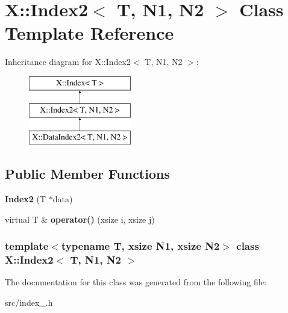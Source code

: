 \hypertarget{class_x_1_1_index2}{\section{X\-:\-:Index2$<$ T, N1, N2 $>$ Class Template Reference}
\label{class_x_1_1_index2}
}
Inheritance diagram for X\-:\-:Index2$<$ T, N1, N2 $>$\-:\begin{figure}[H]
\begin{center}
\leavevmode
\includegraphics[height=3.000000cm]{class_x_1_1_index2}
\end{center}
\end{figure}
\subsection*{Public Member Functions}
\begin{DoxyCompactItemize}
\item 
\hypertarget{class_x_1_1_index2_a1b791266a385e8e171f4a1d5bc72e747}{{\bfseries Index2} (T $\ast$data)}\label{class_x_1_1_index2_a1b791266a385e8e171f4a1d5bc72e747}

\item 
\hypertarget{class_x_1_1_index2_a06e8ccdbe72125ccff7b5d8db35892e7}{virtual T \& {\bfseries operator()} (xsize i, xsize j)}\label{class_x_1_1_index2_a06e8ccdbe72125ccff7b5d8db35892e7}

\end{DoxyCompactItemize}
\subsubsection*{template$<$typename T, xsize N1, xsize N2$>$ class X\-::\-Index2$<$ T, N1, N2 $>$}



The documentation for this class was generated from the following file\-:\begin{DoxyCompactItemize}
\item 
src/index\-\_.\-h\end{DoxyCompactItemize}
